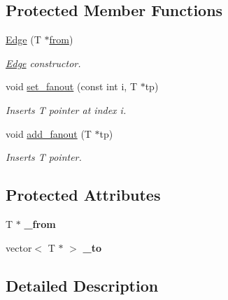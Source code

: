 \subsection*{Protected Member Functions}
\begin{DoxyCompactItemize}
\item 
\hyperlink{classTiming__Analysis_1_1Edge_a64a07a7a08de0e2fd29b1d1db98c5d2d}{Edge} (T $\ast$\hyperlink{classTiming__Analysis_1_1Edge_a47020ea89fd9fde438adc814a731a23d}{from})
\begin{DoxyCompactList}\small\item\em \hyperlink{classTiming__Analysis_1_1Edge}{Edge} constructor. \end{DoxyCompactList}\item 
void \hyperlink{classTiming__Analysis_1_1Edge_a81bc4f5f07902385b2234bf591822a52}{set\-\_\-fanout} (const int i, T $\ast$tp)
\begin{DoxyCompactList}\small\item\em Inserts T pointer at index i. \end{DoxyCompactList}\item 
void \hyperlink{classTiming__Analysis_1_1Edge_ab9195f5c50f8a66b29f6856c9629fcc8}{add\-\_\-fanout} (T $\ast$tp)
\begin{DoxyCompactList}\small\item\em Inserts T pointer. \end{DoxyCompactList}\end{DoxyCompactItemize}
\subsection*{Protected Attributes}
\begin{DoxyCompactItemize}
\item 
\hypertarget{classTiming__Analysis_1_1Edge_a718ef7f37c4d9ddf867ef15eaa96ae43}{T $\ast$ {\bfseries \-\_\-from}}\label{classTiming__Analysis_1_1Edge_a718ef7f37c4d9ddf867ef15eaa96ae43}

\item 
\hypertarget{classTiming__Analysis_1_1Edge_ae1bc9c1f6a84a2b4a116d5c4571fba02}{vector$<$ T $\ast$ $>$ {\bfseries \-\_\-to}}\label{classTiming__Analysis_1_1Edge_ae1bc9c1f6a84a2b4a116d5c4571fba02}

\end{DoxyCompactItemize}


\subsection{Detailed Description}
